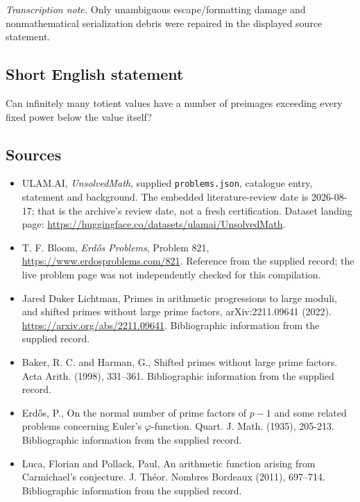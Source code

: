 \documentclass[11pt,a4paper]{article}
\begin{document}
{\small\emph{Transcription note.} Only unambiguous escape/formatting damage and nonmathematical serialization debris were repaired in the displayed source statement.}

\subsection{Short English statement}

Can infinitely many totient values have a number of preimages exceeding every fixed power below the value itself?

\subsection{Sources}

{\small

\begin{itemize}

\item[\hypertarget{source:statement:1}{S1}] ULAM.AI, \emph{UnsolvedMath}, supplied \texttt{problems.json}, catalogue entry, statement and background. The embedded literature-review date is 2026-08-17; that is the archive’s review date, not a fresh certification. Dataset landing page: \url{https://huggingface.co/datasets/ulamai/UnsolvedMath}.

\item[\hypertarget{source:statement:2}{S2}] T. F. Bloom, \emph{Erdős Problems}, Problem 821, \url{https://www.erdosproblems.com/821}. Reference from the supplied record; the live problem page was not independently checked for this compilation.

\item[\hypertarget{source:statement:3}{S3}] Jared Duker Lichtman, Primes in arithmetic progressions to large moduli, and shifted primes without large prime factors, arXiv:2211.09641 (2022). \url{https://arxiv.org/abs/2211.09641}. Bibliographic information from the supplied record.

\item[\hypertarget{source:statement:4}{S4}] Baker, R. C. and Harman, G., Shifted primes without large prime factors. Acta Arith. (1998), 331--361. Bibliographic information from the supplied record.

\item[\hypertarget{source:statement:5}{S5}] Erd\H{o}s, P., On the normal number of prime factors of $p-1$ and some related problems concerning Euler's $\varphi$-function. Quart. J. Math. (1935), 205-213. Bibliographic information from the supplied record.

\item[\hypertarget{source:statement:6}{S6}] Luca, Florian and Pollack, Paul, An arithmetic function arising from {C}armichael's conjecture. J. Th\'{e}or. Nombres Bordeaux (2011), 697--714. Bibliographic information from the supplied record.

\end{itemize}

}

\label{end:statement}
\end{document}
